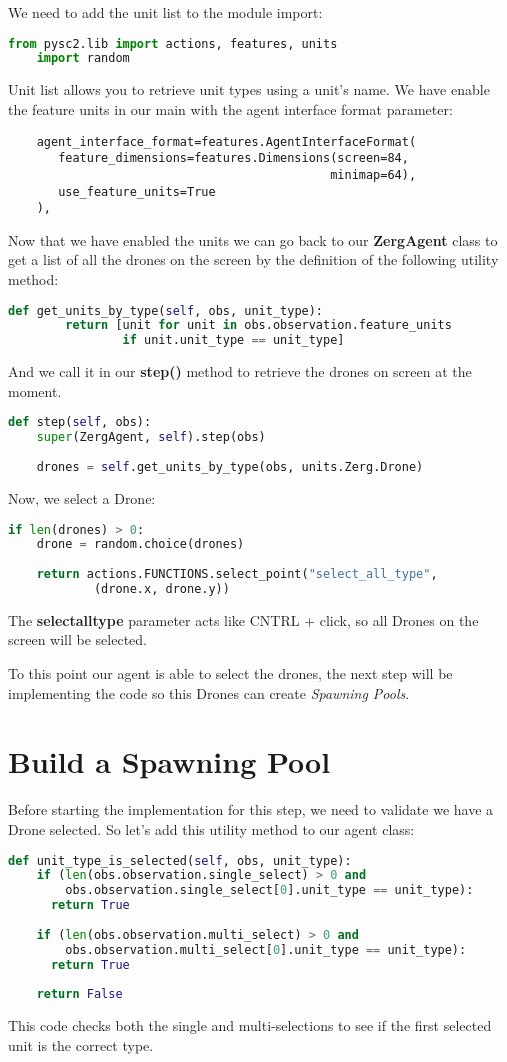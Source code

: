 \documentclass[11pt]{report}            %
\begin{document}
We need to add the unit list to the module import:
\begin{lstlisting}[language=Python]
    from pysc2.lib import actions, features, units
    import random                
\end{lstlisting}
Unit list allows you to retrieve unit types using a unit's name. We have enable the feature units in our main with the agent interface format parameter:
\begin{lstlisting}
    agent_interface_format=features.AgentInterfaceFormat(
       feature_dimensions=features.Dimensions(screen=84,
                                             minimap=64),
       use_feature_units=True
    ),
\end{lstlisting}
Now that we have enabled the units we can go back to our \textbf{ZergAgent} class to get a list of all the drones on the screen by the definition of the following utility method:
\begin{lstlisting}[language=Python]
def get_units_by_type(self, obs, unit_type):
        return [unit for unit in obs.observation.feature_units
                if unit.unit_type == unit_type]
\end{lstlisting}
And we call it in our \textbf{step()} method to retrieve the drones on screen at the moment.
\begin{lstlisting}[language=Python]
def step(self, obs):
    super(ZergAgent, self).step(obs)
    
    drones = self.get_units_by_type(obs, units.Zerg.Drone)
\end{lstlisting}
Now, we select a Drone:
\begin{lstlisting}[language=Python]
if len(drones) > 0:
    drone = random.choice(drones)
      
    return actions.FUNCTIONS.select_point("select_all_type",
            (drone.x, drone.y))
\end{lstlisting}
The \textbf{select\textunderscore all\textunderscore type} parameter acts like CNTRL + click, so all Drones on the screen will be selected. 

To this point our agent is able to select the drones, the next step will be implementing the code so this Drones can create \emph{Spawning Pools}.
\section{Build a Spawning Pool}
Before starting the implementation for this step, we need to validate we have a Drone selected. So let's add this utility method to our agent class:
\begin{lstlisting}[language=Python]
def unit_type_is_selected(self, obs, unit_type):
    if (len(obs.observation.single_select) > 0 and
        obs.observation.single_select[0].unit_type == unit_type):
      return True
    
    if (len(obs.observation.multi_select) > 0 and
        obs.observation.multi_select[0].unit_type == unit_type):
      return True
    
    return False
\end{lstlisting}
This code checks both the single and multi-selections to see if the first selected unit is the correct type.
\end{document}
